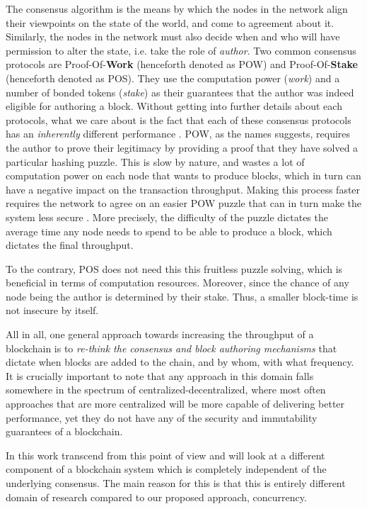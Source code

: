 The consensus algorithm is the means by which the nodes in the network align their viewpoints on the state of the world, and come to agreement about it. Similarly, the nodes in the network must also decide when and who will have permission to alter the state, i.e. take the role of \textit{author}. Two common consensus protocols are Proof-Of-\textbf{Work} (henceforth denoted as POW) and Proof-Of-\textbf{Stake} (henceforth denoted as POS). They use the computation power (\textit{work}) and a number of bonded tokens (\textit{stake}) as their guarantees that the author was indeed eligible for authoring a block. Without getting into further details about each protocols, what we care about is the fact that each of these consensus protocols has an \textit{inherently} different performance \cite{survey_on_all}. POW, as the names suggests, requires the author to prove their legitimacy by providing a proof that they have solved a particular hashing puzzle. This is slow by nature, and wastes a lot of computation power on each node that wants to produce blocks, which in turn can have a negative impact on the transaction throughput. Making this process faster requires the network to agree on an easier POW puzzle that can in turn make the system less secure \cite{security_of_bitcoin}. More precisely, the difficulty of the puzzle dictates the average time any node needs to spend to be able to produce a block, which dictates the final throughput. 

To the contrary, POS does not need this this fruitless puzzle solving, which is beneficial in terms of computation resources. Moreover, since the chance of any node being the author is determined by their stake. Thus, a smaller block-time is not insecure by itself. 

All in all, one general approach towards increasing the throughput of a blockchain is to \textit{re-think the consensus and block authoring mechanisms} that dictate when blocks are added to the chain, and by whom, with what frequency. It is crucially important to note that any approach in this domain falls somewhere in the spectrum of centralized-decentralized, where most often approaches that are more centralized will be more capable of delivering better performance, yet they do not have any of the security and immutability guarantees of a blockchain. 

In this work transcend from this point of view and will look at a different component of a blockchain system which is completely independent of the underlying consensus. The main reason for this is that this is entirely different domain of research compared to our proposed approach, concurrency.

